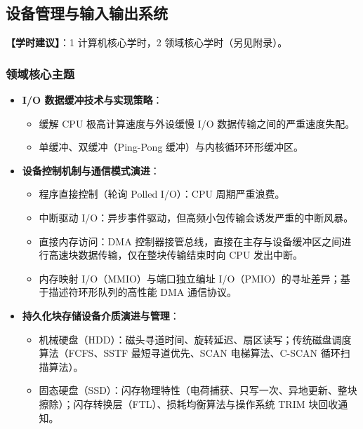 \subsection{设备管理与输入输出系统}
\textbf{【学时建议】}：1 计算机核心学时，2 领域核心学时（另见附录）。

\subsubsection{领域核心主题}
\begin{itemize}\setlength{\itemsep}{0pt}\setlength{\parskip}{0pt}
    \item \textbf{I/O 数据缓冲技术与实现策略}：
    \begin{itemize}\setlength{\itemsep}{0pt}\setlength{\parskip}{0pt}
        \item 缓解 CPU 极高计算速度与外设缓慢 I/O 数据传输之间的严重速度失配。
        \item 单缓冲、双缓冲（Ping-Pong 缓冲）与内核循环环形缓冲区。
    \end{itemize}
    \item \textbf{设备控制机制与通信模式演进}：
    \begin{itemize}\setlength{\itemsep}{0pt}\setlength{\parskip}{0pt}
        \item 程序直接控制（轮询 Polled I/O）：CPU 周期严重浪费。
        \item 中断驱动 I/O：异步事件驱动，但高频小包传输会诱发严重的中断风暴。
        \item 直接内存访问：DMA 控制器接管总线，直接在主存与设备缓冲区之间进行高速块数据传输，仅在整块传输结束时向 CPU 发出中断。
        \item 内存映射 I/O（MMIO）与端口独立编址 I/O（PMIO）的寻址差异；基于描述符环形队列的高性能 DMA 通信协议。
    \end{itemize}
    \item \textbf{持久化块存储设备介质演进与管理}：
    \begin{itemize}\setlength{\itemsep}{0pt}\setlength{\parskip}{0pt}
        \item 机械硬盘（HDD）：磁头寻道时间、旋转延迟、扇区读写；传统磁盘调度算法（FCFS、SSTF 最短寻道优先、SCAN 电梯算法、C-SCAN 循环扫描算法）。
        \item 固态硬盘（SSD）：闪存物理特性（电荷捕获、只写一次、异地更新、整块擦除）；闪存转换层（FTL）、损耗均衡算法与操作系统 TRIM 块回收通知。
    \end{itemize}
\end{itemize}


